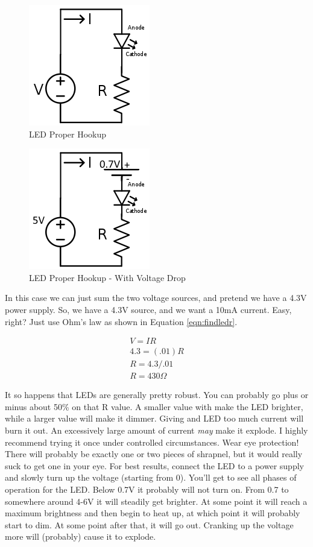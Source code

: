 \begin{figure}[h]
\centering
\includegraphics[scale=0.75]{ledcircuit.png}
\caption{LED Proper Hookup}
\label{fig:ledcircuit}
\end{figure}

\begin{figure}[h]
\centering
\includegraphics[scale=0.75]{ledcircuitvoltagedrop.png}
\caption{LED Proper Hookup - With Voltage Drop}
\label{fig:ledcircuitvoltagedrop}
\end{figure}

In this case we can just sum the two voltage sources, and pretend we have a 4.3V power supply. So, we have a 4.3V source, and we want a 10mA current. Easy, right? Just use Ohm's law as shown in Equation \ref{eqn:findledr}.

\begin{equation} \label{eqn:findledr}
\begin{split}
V = IR \\
4.3 = (.01)R\\
R = 4.3/.01 \\
R = 430\Omega
\end{split}
\end{equation}

It so happens that LEDs are generally pretty robust. You can probably go plus or minus about 50\% on that R value. A smaller value with make the LED brighter, while a larger value will make it dimmer. Giving and LED too much current will burn it out. An excessively large amount of current \textit{may} make it explode. I highly recommend trying it once under controlled circumstances. Wear eye protection! There will probably be exactly one or two pieces of shrapnel, but it would really suck to get one in your eye. For best results, connect the LED to a power supply and slowly turn up the voltage (starting from 0). You'll get to see all phases of operation for the LED. Below 0.7V it probably will not turn on. From 0.7 to somewhere around 4-6V it will steadily get brighter. At some point it will reach a maximum brightness and then begin to heat up, at which point it will probably start to dim. At some point after that, it will go out. Cranking up the voltage more will (probably) cause it to explode. 

